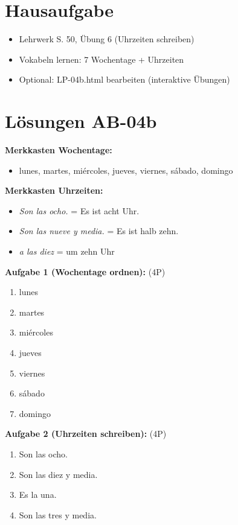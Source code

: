 \documentclass[11pt,a4paper]{article}
\begin{document}
\section{Hausaufgabe}

\begin{itemize}
    \item Lehrwerk S. 50, Übung 6 (Uhrzeiten schreiben)
    \item Vokabeln lernen: 7 Wochentage + Uhrzeiten
    \item Optional: LP-04b.html bearbeiten (interaktive Übungen)
\end{itemize}

\section{Lösungen AB-04b}

\textbf{Merkkasten Wochentage:}
\begin{itemize}
    \item lunes, martes, miércoles, jueves, viernes, sábado, domingo
\end{itemize}

\textbf{Merkkasten Uhrzeiten:}
\begin{itemize}
    \item \textit{Son las ocho.} = Es ist acht Uhr.
    \item \textit{Son las nueve y media.} = Es ist halb zehn.
    \item \textit{a las diez} = um zehn Uhr
\end{itemize}

\textbf{Aufgabe 1 (Wochentage ordnen):} (4P)
\begin{enumerate}
    \item lunes
    \item martes
    \item miércoles
    \item jueves
    \item viernes
    \item sábado
    \item domingo
\end{enumerate}

\textbf{Aufgabe 2 (Uhrzeiten schreiben):} (4P)
\begin{enumerate}[label=\alph*)]
    \item Son las ocho.
    \item Son las diez y media.
    \item Es la una.
    \item Son las tres y media.
\end{enumerate}
\end{document}
